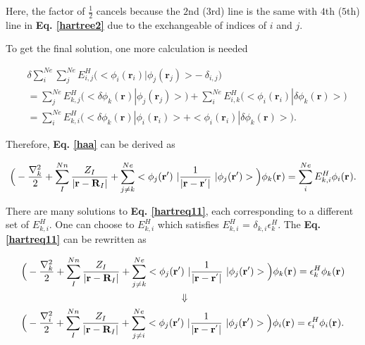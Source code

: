 \documentclass[a4paper, 12pt, titlepage,oneside,drop]{kthesis}
\begin{document}
Here, the factor of $\frac{1}{2}$ cancels because the $2$nd ($3$rd) line is the same with $4$th ($5$th) line in \textbf{Eq. \ref{hartree2}} due to the exchangeable of indices of $i$ and $j$. 

To get the final solution, one more calculation is needed 

\begin{equation} \begin{split}\label{xixihaha}
& \delta \sum\limits_i^{{Ne}} \sum\limits_j^{{Ne}} E_{i,j}^{{H}} \Big(<\phi_{i}(\textbf{r}_{i}) | \phi_{j}(\textbf{r}_{j}) > - \ \delta_{i,j}\Big) \\
& = \sum\limits_j^{{Ne}} E_{k,j}^{{H}} \Big(< \delta \phi_{k}(\textbf{r}) | \phi_{j}(\textbf{r}_{j}) > \Big) + \sum\limits_i^{{Ne}} E_{i,k}^{{H}} \Big(<\phi_{i}(\textbf{r}_{i}) | \delta \phi_{k}(\textbf{r}) >\Big) \\
& = \sum\limits_i^{{Ne}} E_{k,i}^{{H}} \Big(< \delta \phi_{k}(\textbf{r}) | \phi_{i}(\textbf{r}_{i}) >  + <\phi_{i}(\textbf{r}_{i}) | \delta \phi_{k}(\textbf{r}) >\Big).
\end{split}
\end{equation}


Therefore, \textbf{Eq. \ref{haa}} can be derived as 

\begin{equation}\label{hartreq11}
\Big(-\frac{\nabla^{2}_{k}}{2} + \sum\limits_I^{{Nn}} \frac{Z_{I}}{|\textbf{r}-\textbf{R}_{I}|} + \sum\limits_{j \neq k}^{{Ne}}  <\bwfn<j><'>\ | \frac{1}{|\textbf{r} - \textbf{r}^{'} |} \ | \bwfn<j><'>>\Big) \bwff<k><> = \sum\limits_i^{{Ne}} E_{k,i}^{H} \bwff<i><>.
\end{equation}

There are many solutions to \textbf{Eq. \ref{hartreq11}}, each corresponding to a different set of $E_{k,i}^{H}$. One can choose to $E_{k,i}^{H}$ which satisfies $E_{k,i}^{H}$ = $\delta_{k,i}\epsilon_k^{{H}}$. The \textbf{Eq. \ref{hartreq11}}
can be rewritten as

\begin{equation}\begin{split}\label{hartreq}
& \Big(-\frac{\nabla^{2}_{k}}{2} + \sum\limits_I^{{Nn}} \frac{Z_{I}}{|\textbf{r}-\textbf{R}_{I}|} + \sum\limits_{j \neq k}^{{Ne}}  <\bwfn<j><'>\ | \frac{1}{|\textbf{r} - \textbf{r}^{'} |} \ | \bwfn<j><'>>\Big) \bwff<k><> = \epsilon_k^{{H}} \bwff<k><>  \\
&  \qquad \qquad \qquad  \qquad \qquad \qquad \qquad \qquad  \Downarrow  \\
& \Big(-\frac{\nabla^{2}_{i}}{2} + \sum\limits_I^{{Nn}} \frac{Z_{I}}{|\textbf{r}-\textbf{R}_{I}|} + \sum\limits_{j \neq i}^{{Ne}}  <\bwfn<j><'>\ | \frac{1}{|\textbf{r} - \textbf{r}^{'} |} \ | \bwfn<j><'>>\Big) \bwff<i><> = \epsilon_i^{{H}} \bwff<i><>.  \\
\end{split}
\end{equation}
\end{document}
